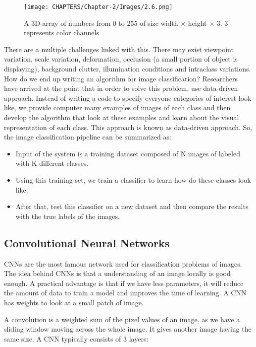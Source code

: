 \begin{figure}[H]
	\centering
	\captionsetup{justification=centering,margin=2cm}
	\texttt{[image: CHAPTERS/Chapter-2/Images/2.6.png]}
	\caption{A 3D-array of numbers from 0 to 255 of size width $\times$ height $\times$ 3. 3 represents color channels}
	\label{fig:2.6}
\end{figure}

There are a multiple challenges linked with this. There 
may exist viewpoint variation, scale variation, deformation, occlusion (a small portion 
of object is displaying), background clutter, illumination conditions and intraclass 
variations. How do we end up writing an algorithm for image classification? Researchers have 
arrived at the point that in order to solve this problem, use data-driven approach. Instead 
of writing a code to specify everyone categories of interest look like, we provide computer 
many examples of images of each class and then develop the algorithm that look at these 
examples and learn about the visual representation of each class. This approach is known 
as data-driven approach. So, the image classification pipeline can be summarized as:

\begin{itemize}
\item Input of the system is a training dataset composed 
of N images of labeled with K different classes.
\item Using this training set, we train a classifier to learn how do these classes look like.
\item After that, test this classifier on a new dataset and then compare the results with the true labels of the images.
\end{itemize}

\subsection{Convolutional Neural Networks}

CNNs are the most famous network used 
for classification problems of images. The idea behind CNNs is that a 
understanding of an image locally is good enough. A practical advantage is 
that if we have less parameters, it will reduce the amount of data to train 
a model and improves the time of learning. A CNN has weights to look at a small 
patch of image. 

A convolution is a weighted sum of  the pixel values of an image, as 
we have a sliding window moving across the whole image. It gives another 
image having the same size. A CNN typically consists of 3 layers:

